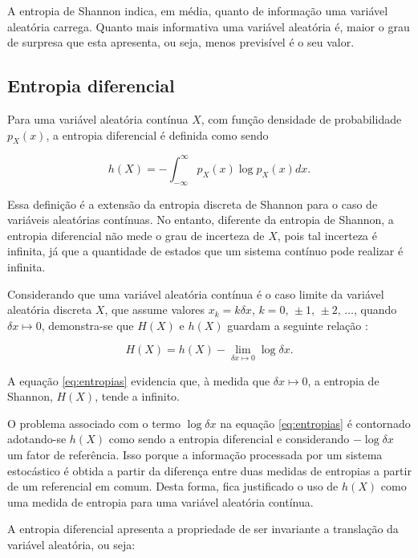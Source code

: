 A entropia de Shannon indica, em média, quanto de informação uma variável aleatória carrega. Quanto mais informativa uma variável aleatória é, maior o grau de surpresa que esta apresenta, ou seja, menos previsível é o seu valor.

\subsection{Entropia diferencial}

Para uma variável aleatória contínua $X$, com função densidade de probabilidade $p_X(x)$, a entropia diferencial é definida como sendo \cite{Thomas:2006}

\begin{equation}\label{eq:difent}
h(X) = -\int_{-\infty}^\infty p_X(x)\log{p_X(x)}dx\text{.}
\end{equation}

Essa definição é a extensão da entropia discreta de Shannon para o caso de variáveis aleatórias contínuas. No entanto, diferente da entropia de Shannon, a entropia diferencial não mede o grau de incerteza de $X$, pois tal incerteza é infinita, já que a quantidade de estados que um sistema contínuo pode realizar é infinita.

Considerando que uma variável aleatória contínua é o caso limite da variável aleatória discreta $X$, que assume valores $x_k = k \delta x$, $k = 0\text{, }\pm 1\text{, } \pm 2\text{, }\ldots$, quando $\delta x \mapsto 0$, demonstra-se que $H(X)$ e $h(X)$ guardam a seguinte relação \cite{Thomas:2006}:

\begin{equation} \label{eq:entropias}
H(X) = h(X) - \lim_{\delta x \mapsto 0}{\log{\delta x}}\text{.}
\end{equation}

A equação \ref{eq:entropias} evidencia que, à medida que $\delta x \mapsto 0 $, a entropia de Shannon, $H(X)$, tende a infinito. 

O problema associado com o termo $\log \delta x$ na equação \ref{eq:entropias} é contornado adotando-se $h(X)$ como sendo a entropia diferencial e considerando $-\log \delta x$ um fator de referência. Isso porque a informação processada por um sistema estocástico é obtida a partir da diferença entre duas medidas de entropias a partir de um referencial em comum. Desta forma, fica justificado o uso de $h(X)$ como uma medida de entropia para uma variável aleatória contínua.

A entropia diferencial apresenta a propriedade de ser invariante a translação da variável aleatória, ou seja:

